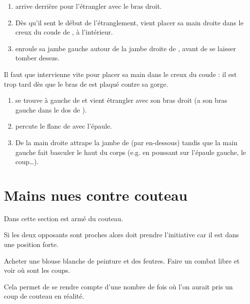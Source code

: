 \begin{technique}

\begin{enumerate}
	\item \A arrive derrière \D pour l'étrangler avec le bras droit.
	
	\item Dès qu'il sent le début de l'étranglement, \D vient placer sa main droite dans le creux du coude de \A, à l'intérieur.
	
	\item {} \D enroule sa jambe gauche autour de la jambe droite de \A, avant de se laisser tomber dessus.
\end{enumerate}

Il faut que \D intervienne vite pour placer sa main dans le creux du coude : il est trop tard dès que le bras de \A est plaqué contre sa gorge.

\end{technique}


\begin{technique}

\begin{enumerate}
	\item \A se trouve à gauche de \D et vient étrangler avec son bras droit (\D a son bras gauche dans le dos de \A).
	
	\item \D percute le flanc de \A avec l'épaule.
	
	\item De la main droite \D attrape la jambe de \A (par en-dessous) tandis que la main gauche fait basculer le haut du corps (e.g. en poussant sur l'épaule gauche, le coup…). 
\end{enumerate}

\end{technique}


\section{Mains nues contre couteau}


Dans cette section \A est armé du couteau.

Si les deux opposants sont proches alors \A doit prendre l'initiative car il est dans une position forte.


\begin{exercice}
Acheter une blouse blanche de peinture et des feutres.
Faire un combat libre et voir où sont les coups.

Cela permet de se rendre compte d'une nombre de fois où l'on aurait pris un coup de couteau en réalité.
\end{exercice}



